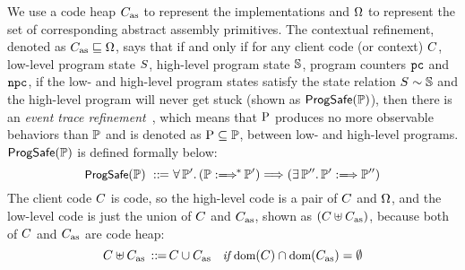 We use a code heap $C_{\text{as}}$
to represent the implementations
 and $\Omega$ to represent the set of corresponding
abstract assembly primitives.
The contextual refinement,
denoted as $C_{\text{as}} \sqsubseteq \Omega$,
says that if and only if for any client code
(or context) $C$, low-level program
state $S$, high-level program state $\mathbb{S}$, program counters
$\texttt{pc}$ and $\texttt{npc}$, if the low- and high-level program states satisfy the
state relation ${S} \sim {\mathbb{S}}$ and the high-level program
will never get stuck (shown as $\textsf{ProgSafe}(\mathbb{P})$),
then there is an {\it event trace refinement}~\cite{liang14lics},
which means that $\text{P}$ produces no more observable behaviors
than $\mathbb{P}$ and is denoted as $\text{P} \subseteq \mathbb{P}$,
between low- and high-level programs. $\textsf{ProgSafe}(\mathbb{P})$
is defined formally below:
\[
    \small
    \progsafe(\HProg) \ \define \
    \forall \, \HProg'. \,
    (\HGlobMultiTrans{\HProg}{}{*}{\HProg'})
    \Longrightarrow
    (\exists \, \HProg''. \,
        \HGlobTrans{\HProg'}{}{\HProg''})
\]
The client code $C$ is \sparc{} code, so
the high-level code is a pair of $C$ and $\Omega$,
and the low-level code is just the union of
$C$ and $C_{\text{as}}$, shown as
$(C\uplus C_{\text{as}})$, because both of
$C$ and $C_{\text{as}}$ are \sparc{} code heap:
\[
    \small
    C \uplus C_{\text{as}} \,::\!\!{=}\,
    C \cup C_{\text{as}} \quad
    \textit{if} \ \text{dom}(C)\cap\text{dom}(C_{\text{as}}) = \emptyset
\]

